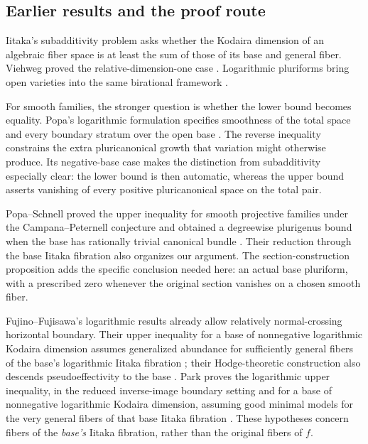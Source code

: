 \subsection{Earlier results and the proof route}

Iitaka's subadditivity problem asks whether
the Kodaira dimension of an algebraic fiber space is at least the sum
of those of its base and general fiber. Viehweg proved the
relative-dimension-one case \cite[Introduction]{Viehweg1977}.
Logarithmic pluriforms bring open varieties into the same birational
framework \cite[Introduction]{IitakaLogForms1976}.

For smooth families, the stronger question is whether the lower bound
becomes equality. Popa's logarithmic formulation specifies smoothness
of the total space and every boundary stratum over the open base
\cite[Conjecture 3.9 and footnote 5]{PopaSurvey}. The reverse inequality
constrains the extra pluricanonical growth that variation might
otherwise produce. Its negative-base case makes the distinction from
subadditivity especially clear: the lower bound is then automatic,
whereas the upper bound asserts vanishing of every positive
pluricanonical space on the total pair.

Popa--Schnell proved the upper inequality for smooth projective
families under the Campana--Peternell conjecture and obtained a
degreewise plurigenus bound when the base has rationally trivial
canonical bundle \cite[Theorems C and H]{PopaSchnellSmooth}.
Their reduction through the base Iitaka fibration also organizes our
argument. The section-construction proposition adds the specific
conclusion needed here: an actual base pluriform, with a prescribed
zero whenever the original section vanishes on a chosen smooth fiber.

Fujino--Fujisawa's logarithmic results already allow relatively
normal-crossing horizontal boundary. Their upper inequality for a base of nonnegative logarithmic Kodaira
dimension assumes generalized abundance for sufficiently general fibers of the base's
logarithmic Iitaka fibration \cite[Theorem 1.12]{FF}; their Hodge-theoretic construction also
descends pseudoeffectivity to the base
\cite[Theorems 1.4 and 4.5]{FF}.
Park proves the logarithmic upper inequality, in the reduced
inverse-image boundary setting and for a base of nonnegative
logarithmic Kodaira dimension, assuming good minimal models for the
very general fibers of that base Iitaka fibration
\cite[Theorem 1.12]{Park}. These hypotheses concern fibers of the
\emph{base's} Iitaka fibration, rather than the original fibers of $f$.

